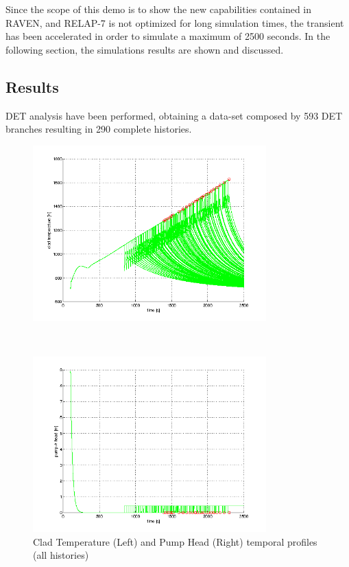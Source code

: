 Since the scope of this demo is to show the new capabilities contained in RAVEN, and RELAP-7 is not optimized for long simulation times, the transient has been accelerated in order to simulate a maximum of 2500 seconds. 
In the following section, the simulations results are shown and discussed.
\subsection{Results} 
DET analysis have been performed, obtaining a data-set composed by 593 DET branches resulting in 290 complete histories.

\begin{figure}
 \begin{minipage}[b]{8.5cm}
   \centering
   \includegraphics[width=9cm]{figures/CladTemperature.png}
 \end{minipage}
 \ \hspace{2mm} \hspace{3mm} \
 \begin{minipage}[b]{8.5cm}
   \centering
   \includegraphics[width=9cm]{figures/HeadPump.png}
 \end{minipage}
\caption{Clad Temperature (Left) and Pump Head (Right) temporal profiles (all histories)}
\label{fig:ESBPall}
\end{figure}
\vspace{-5mm}

